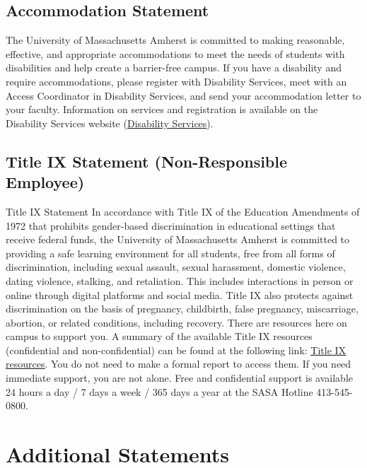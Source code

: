 \documentclass[11pt]{article}
\newcommand{\link}[2]{\href{#1}{\uline{#2}}}
\begin{document}
\subsection*{Accommodation Statement}
The University of Massachusetts Amherst is committed to making reasonable, effective, and appropriate accommodations to meet the needs of students with disabilities and help create a barrier-free campus. If you have a disability and require accommodations, please register with Disability Services, meet with an Access Coordinator in Disability Services, and send your accommodation letter to your faculty. Information on services and registration is available on the Disability Services website (\link{https://www.umass.edu/disability/}{Disability Services}).

\subsection*{Title IX Statement (Non-Responsible Employee)}
Title IX Statement
In accordance with Title IX of the Education Amendments of 1972 that prohibits gender-based discrimination in educational settings that receive federal funds, the University of Massachusetts Amherst is committed to providing a safe learning environment for all students, free from all forms of discrimination, including sexual assault, sexual harassment, domestic violence, dating violence, stalking, and retaliation. This includes interactions in person or online through digital platforms and social media.
Title IX also protects against discrimination on the basis of pregnancy, childbirth, false pregnancy, miscarriage, abortion, or related conditions, including recovery. There are resources here on campus to support you. A summary of the available Title IX resources (confidential and non-confidential) can be found at the following link: \link{https://www.umass.edu/titleix/resources}{Title IX resources}. You do not need to make a formal report to access them. If you need immediate support, you are not alone.
Free and confidential support is available 24 hours a day / 7 days a week / 365 days a year at the SASA Hotline 413-545-0800.

\section*{Additional Statements}
\end{document}
